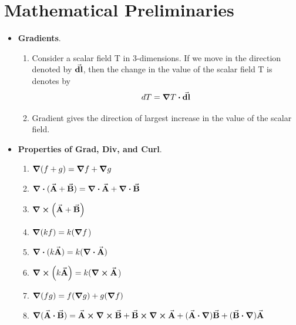 \documentclass[12pt, oneside]{book}
\title{\sffamily{PH 108 Formulae}}
\author{\sffamily{Advait Risbud} \\
 \sffamily{Jujhaar Singh} \\
 \sffamily{Kartik Gokhale}}
\date{2021}
\begin{document}
	\maketitle
	\sffamily
	
\tableofcontents

	\chapter{Mathematical Preliminaries}
	\begin{itemize}
		
		\item \textbf{Gradients}. 
		\begin{enumerate}
		\item Consider a scalar field T in 3-dimensions. If we move in the direction denoted by $\va{\textbf{dl}}$, then the change in the value of the scalar field T is denotes by 
		\begin{equation}
			dT=\grad{T}\vdot \va{\textbf{dl}}
		\end{equation}
	    \item Gradient gives the direction of largest increase in the value of the scalar field.
	\end{enumerate}
      
      
       \item \textbf{Properties of Grad, Div, and Curl}.
       \begin{enumerate}
       	\item $\grad{(f+g)}=\grad{f}+\grad{g}$
       	
       	\item $\grad \vdot (\va{A}+\va{B})=\grad \vdot \va{A}+\grad \vdot \va{B}$
       	
       	\item $\curl (\va{A}+\va{B})$ 
       	

       	
       	
       	\item $\grad{(kf)}=k(\grad{f}$)
       	
       	\item $\div{(k\va{A})}=k(\div{\va{A}})$
       	
       	\item $\curl (k\va{A})=k( \curl{\va{A}}$)
       	
       	\item $\grad{(fg)}=f(\grad{g})+g(\grad{f})$
       	
       	\item $\grad{(\va{A}\vdot \va{B})}=\va{A}\cross\curl{\va{B}}+\va{B}\cross \curl{\va{A}}+(\va{A}\vdot \grad)\va{B}+(\va{B}\vdot \grad)\va{A}$
       	

\end{enumerate}
\end{itemize}
\end{document}
